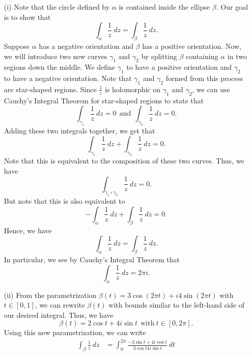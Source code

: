 \documentclass[a4paper]{article}
\begin{document}
\begin{solution}[a]
   \begin{enumerate}
       \item[(i)] Note that the circle defined by \( \alpha \) is contained inside the ellipse \( \beta \). Our goal is to show that 
           \[  \int_{ \alpha }^{  } \frac{ 1 }{ z }  \ dz = \int_{ \beta }^{  } \frac{ 1 }{ z }  \ dz. \]
           Suppose \( \alpha \) has a negative orientation and \( \beta \) has a positive orientation. Now, we will introduce two new curves \( {\gamma}_{1} \) and \( {\gamma}_{2} \) by splitting \( \beta  \) containing \( \alpha \) in two regions down the middle. We define \( {\gamma}_{1}  \) to have a positive orientation and \( {\gamma}_{2} \) to have a negative orientation. Note that \( {\gamma}_{1} \) and \( {\gamma}_{2} \) formed from this process are star-shaped regions. Since \( \frac{ 1 }{ z } \) is holomorphic on \( {\gamma}_{1} \) and \( {\gamma}_{2} \), we can use Cauchy's Integral Theorem for star-shaped regions to state that 
           \[ \int_{ {\gamma}_{1} }^{  } \frac{ 1 }{ z }  \ dz = 0 \ \ \text{and} \ \ \int_{ {\gamma}_{2} }^{  } \frac{ 1 }{ z }  \ dz = 0. \]
           Adding these two integrals together, we get that 
           \[  \int_{ {\gamma}_{1} }^{  } \frac{ 1 }{ z }  \ dz + \int_{ {\gamma}_{2} }^{  } \frac{ 1 }{ z }  \ dz = 0.  \]
           Note that this is equivalent to the composition of these two curves. Thus, we have 
           \[  \int_{ {\gamma}_{1} \circ {\gamma}_{2} }^{  } \frac{ 1 }{ z }  \ dz = 0.  \]
           But note that this is also equivalent to 
           \[  - \int_{ \alpha }^{  } \frac{ 1 }{ z }  \ dz + \int_{ \beta }^{  } \frac{ 1 }{ z }  \ dz  = 0.  \]
           Hence, we have 
           \[  \int_{ \alpha }^{  } \frac{ 1 }{ z }  \ dz = \int_{ \beta }^{  } \frac{ 1 }{ z }  \ dz. \]
           In particular, we see by Cauchy's Integral Theorem that 
           \[  \int_{ \alpha }^{  } \frac{ 1 }{ z }  \ dz = 2 \pi i.  \]
       \item[(ii)] From the parametrization \( \beta (t) = 3 \cos (2 \pi t ) + i 4 \sin (2 \pi t) \) with \( t \in [0,1] \), we can rewrite \( \beta(t) \) with bounds similar to the left-hand side of our desired integral. Thus, we have  
           \[  \beta(t) = 2 \cos t + 4 i \sin t \ \ \text{with} \ t \in [0,2\pi]. \]
           Using this new parametrization, we can write
           \begin{align*}
               \int_{ \beta  }^{  } \frac{ 1 }{ z } \ dz &= \int_{ 0 }^{ 2 \pi }   \frac{ -3 \sin t + 4 i \cos t  }{ 3 \cos t  4i \sin t  }  \ dt  \\

\end{align*}
\end{enumerate}
\end{solution}
\end{document}
